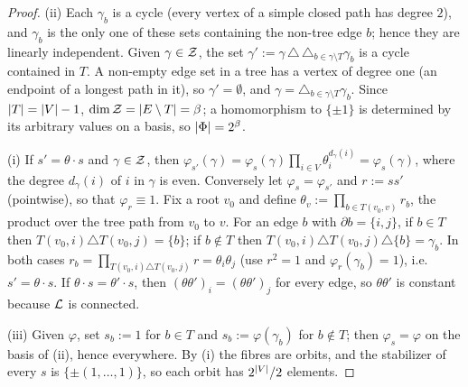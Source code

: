 \begin{proof}
(ii) Each $\gamma_b$ is a cycle (every vertex of a simple closed path has degree $2$), and $\gamma_b$ is the
only one of these sets containing the non-tree edge $b$; hence they are linearly independent.  Given
$\gamma\in\mathcal{Z}$, the set $\gamma':=\gamma\,\triangle\,\triangle_{b\in\gamma\setminus T}\gamma_b$ is a cycle
contained in $T$.  A non-empty edge set in a tree has a vertex of degree one (an endpoint of a longest
path in it), so $\gamma'=\emptyset$, and $\gamma=\triangle_{b\in\gamma\setminus T}\gamma_b$.  Since
$\left|T\right|=\left|V\right|-1$, $\dim\mathcal{Z}=\left|E\setminus T\right|=\beta$; a homomorphism to $\{\pm1\}$ is determined by
its arbitrary values on a basis, so $\left|\Phi\right|=2^\beta$.

(i) If $s'=\theta\cdot s$ and $\gamma\in\mathcal{Z}$, then
$\varphi_{s'}(\gamma)=\varphi_s(\gamma)\prod_{i\in V}\theta_i^{d_\gamma(i)}=\varphi_s(\gamma)$, where the
degree $d_\gamma(i)$ of $i$ in $\gamma$ is even.  Conversely let $\varphi_s=\varphi_{s'}$ and $r:=ss'$
(pointwise), so that $\varphi_r\equiv1$.  Fix a root $v_0$ and define $\theta_v:=\prod_{b\in T(v_0,v)}r_b$,
the product over the tree path from $v_0$ to $v$.  For an edge $b$ with $\partial b=\{i,j\}$, if $b\in T$
then $T(v_0,i)\triangle T(v_0,j)=\{b\}$; if $b\notin T$ then $T(v_0,i)\triangle T(v_0,j)\triangle\{b\}=\gamma_b$.
In both cases $r_b=\prod_{T(v_0,i)\triangle T(v_0,j)}r=\theta_i\theta_j$ (use $r^2=1$ and
$\varphi_r(\gamma_b)=1$), i.e.\ $s'=\theta\cdot s$.  If $\theta\cdot s=\theta'\cdot s$, then
$(\theta\theta')_i=(\theta\theta')_j$ for every edge, so $\theta\theta'$ is constant because $\mathcal{L}$ is
connected.

(iii) Given $\varphi$, set $s_b:=1$ for $b\in T$ and $s_b:=\varphi(\gamma_b)$ for $b\notin T$; then
$\varphi_s=\varphi$ on the basis of (ii), hence everywhere.  By (i) the fibres are orbits, and the
stabilizer of every $s$ is $\{\pm(1,\dots,1)\}$, so each orbit has $2^{\left|V\right|}/2$ elements.
\end{proof}

